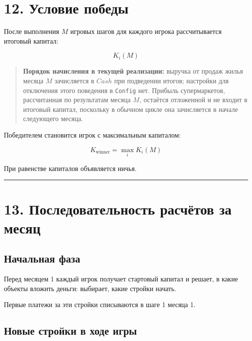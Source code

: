 \documentclass[
]{article}
\begin{document}
\section{12. Условие
победы}\label{ux443ux441ux43bux43eux432ux438ux435-ux43fux43eux431ux435ux434ux44b}

После выполнения \(M\) игровых шагов для каждого игрока рассчитывается
итоговый капитал:

\[
K_i(M)
\]

\begin{quote}
\textbf{Порядок начисления в текущей реализации:} выручка от продаж
жилья месяца \(M\) зачисляется в \(Cash\) при подведении итогов; настройки
для отключения этого поведения в \texttt{Config} нет. Прибыль супермаркетов,
рассчитанная по результатам месяца \(M\), остаётся отложенной и не входит
в итоговый капитал, поскольку в обычном цикле она зачисляется в начале
следующего месяца.
\end{quote}

Победителем становится игрок с максимальным капиталом:

\[
K_{\text{winner}}
=
\max_i K_i(M)
\]

При равенстве капиталов объявляется ничья.

\begin{center}\rule{0.5\linewidth}{0.5pt}\end{center}

\section{13. Последовательность расчётов за
месяц}\label{ux43fux43eux441ux43bux435ux434ux43eux432ux430ux442ux435ux43bux44cux43dux43eux441ux442ux44c-ux440ux430ux441ux447ux451ux442ux43eux432-ux437ux430-ux43cux435ux441ux44fux446}

\subsection{Начальная
фаза}\label{ux43dux430ux447ux430ux43bux44cux43dux430ux44f-ux444ux430ux437ux430}

Перед месяцем 1 каждый игрок получает стартовый капитал и решает, в
какие объекты вложить деньги: выбирает, какие стройки начать.

Первые платежи за эти стройки списываются в шаге 1 месяца 1.

\subsection{Новые стройки в ходе
игры}\label{ux43dux43eux432ux44bux435-ux441ux442ux440ux43eux439ux43aux438-ux432-ux445ux43eux434ux435-ux438ux433ux440ux44b}
\end{document}
